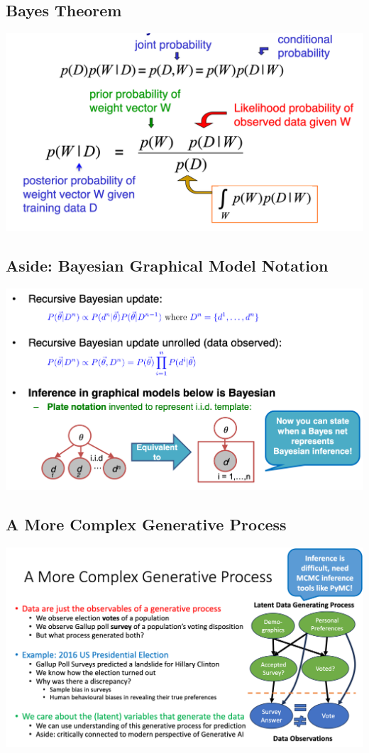 \documentclass[11pt]{article}
\theoremstyle{definition}
\begin{document}
\subsection{Bayes Theorem}
\includegraphics[width=\textwidth/2]{10.png}

\subsection{Aside: Bayesian Graphical Model Notation}
\includegraphics[width=\textwidth]{11.png}

\subsection{A More Complex Generative Process}
\includegraphics[width=\textwidth]{12.png}
\end{document}
